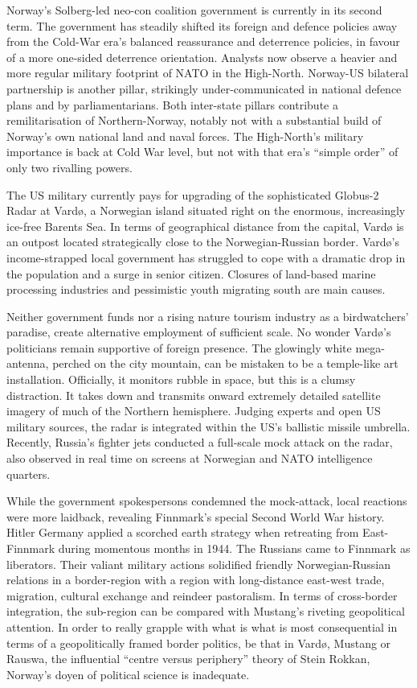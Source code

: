 \documentclass[
  openany]{book}
\begin{document}
Norway's Solberg-led neo-con coalition government is currently in its second term. The government has steadily shifted its foreign and defence policies away from the Cold-War era's balanced reassurance and deterrence policies, in favour of a more one-sided deterrence orientation. Analysts now observe a heavier and more regular military footprint of NATO in the High-North. Norway-US bilateral partnership is another pillar, strikingly under-communicated in national defence plans and by parliamentarians. Both inter-state pillars contribute a remilitarisation of Northern-Norway, notably not with a substantial build of Norway's own national land and naval forces. The High-North's military importance is back at Cold War level, but not with that era's ``simple order'' of only two rivalling powers.

The US military currently pays for upgrading of the sophisticated Globus-2 Radar at Vardø, a Norwegian island situated right on the enormous, increasingly ice-free Barents Sea. In terms of geographical distance from the capital, Vardø is an outpost located strategically close to the Norwegian-Russian border. Vardø's income-strapped local government has struggled to cope with a dramatic drop in the population and a surge in senior citizen. Closures of land-based marine processing industries and pessimistic youth migrating south are main causes.

Neither government funds nor a rising nature tourism industry as a birdwatchers' paradise, create alternative employment of sufficient scale. No wonder Vardø's politicians remain supportive of foreign presence. The glowingly white mega-antenna, perched on the city mountain, can be mistaken to be a temple-like art installation. Officially, it monitors rubble in space, but this is a clumsy distraction. It takes down and transmits onward extremely detailed satellite imagery of much of the Northern hemisphere. Judging experts and open US military sources, the radar is integrated within the US's ballistic missile umbrella. Recently, Russia's fighter jets conducted a full-scale mock attack on the radar, also observed in real time on screens at Norwegian and NATO intelligence quarters.

While the government spokespersons condemned the mock-attack, local reactions were more laidback, revealing Finnmark's special Second World War history. Hitler Germany applied a scorched earth strategy when retreating from East-Finnmark during momentous months in 1944. The Russians came to Finnmark as liberators. Their valiant military actions solidified friendly Norwegian-Russian relations in a border-region with a region with long-distance east-west trade, migration, cultural exchange and reindeer pastoralism. In terms of cross-border integration, the sub-region can be compared with Mustang's riveting geopolitical attention. In order to really grapple with what is what is most consequential in terms of a geopolitically framed border politics, be that in Vardø, Mustang or Rauswa, the influential ``centre versus periphery'' theory of Stein Rokkan, Norway's doyen of political science is inadequate.
\end{document}
